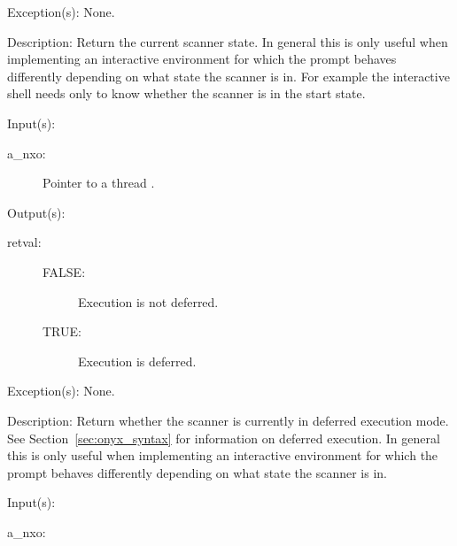 \begin{capi}
\begin{capilist}
	\item[Exception(s): ] None.
	\item[Description: ]
		Return the current scanner state.  In general this is only
		useful when implementing an interactive environment for which
		the prompt behaves differently depending on what state the
		scanner is in.  For example the interactive  shell
		needs only to know whether the scanner is in the start state.
	\end{capilist}
\label{nxo_thread_deferred}
	\begin{capilist}
	\item[Input(s): ]
		\begin{description}\item[]
		\item[a\_nxo: ]
			Pointer to a thread .
		\end{description}
	\item[Output(s): ]
		\begin{description}\item[]
		\item[retval: ]
			\begin{description}\item[]
			\item[FALSE: ]
				Execution is not deferred.
			\item[TRUE: ]
				Execution is deferred.
			\end{description}
		\end{description}
	\item[Exception(s): ] None.
	\item[Description: ]
		Return whether the scanner is currently in deferred execution
		mode.  See Section~\ref{sec:onyx_syntax} for information on
		deferred execution.  In general this is only useful when
		implementing an interactive environment for which the prompt
		behaves differently depending on what state the scanner is in.
	\end{capilist}
\label{nxo_thread_reset}
	\begin{capilist}
	\item[Input(s): ]
		\begin{description}\item[]
		\item[a\_nxo: ]

\end{description}
\end{capilist}
\end{capi}
